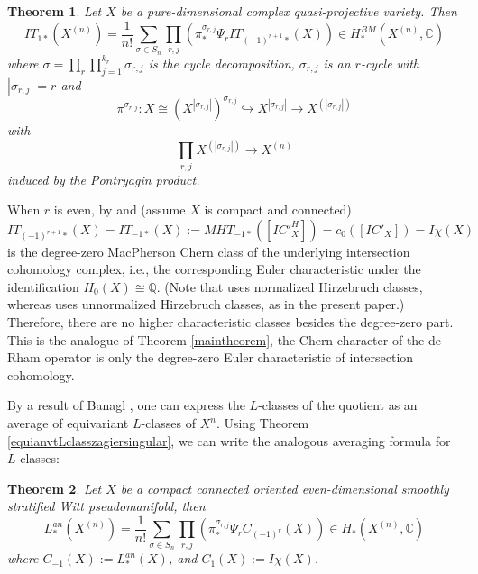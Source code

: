 \documentclass[11pt,leqno,twoside]{amsart}
\theoremstyle{plainsl}
\newtheorem{theorem}{Theorem}[section]
\theoremstyle{definition}
\newcommand{\Q}{\mathbb{Q}}
\begin{document}
 
 \begin{theorem}\cite[Lemma 3.1, 3.2, 3.3]{CMSSY} \label{it1symmetriccmssythm}
 Let $X$ be a pure-dimensional complex quasi-projective variety. Then
\begin{equation}\label{symfactorIT1class} 
    IT_{1*}(X^{(n)})=\frac{1}{n!}\sum_{\sigma\in S_n}  \prod_{r,j} (\pi^{\sigma_{r,j}}_*\Psi_rIT_{(-1)^{r+1}*}(X)) \in H^{BM}_*(X^{(n)},\mathbb{C})
\end{equation}
    where $\sigma=\prod_r\prod^{k_r}_{j=1}\sigma_{r,j}$ is the cycle decomposition, $\sigma_{r,j}$ is an $r$-cycle with $|\sigma_{r,j}|=r$ and
    \[\pi^{\sigma_{r,j}}:X\cong (X^{|\sigma_{r,j}|})^{\sigma_{r,j}} \hookrightarrow X^{|\sigma_{r,j}|} \rightarrow X^{(|\sigma_{r,j}|)}\]
with \[\prod_{r,j} X^{(|\sigma_{r,j}|)}\rightarrow X^{(n)}\]
induced by the Pontryagin product.
\end{theorem}
When $r$ is even, by \cite[Prop.~5.21]{S} and \cite{CMSSY} (assume $X$ is compact and connected)
\begin{equation}\label{mhc-1trivial}
    IT_{(-1)^{r+1}*}(X)=IT_{-1*}(X):=MHT_{-1*}([IC'^H_X])=c_0([IC'_X])=I\chi(X)
\end{equation}
is the degree-zero MacPherson Chern class of the underlying intersection cohomology complex, i.e., the corresponding Euler characteristic  under the identification
$H_0(X)\cong \Q$.
(Note that \cite{S} uses normalized Hirzebruch classes, whereas \cite{CMSSY} uses unnormalized Hirzebruch classes, as in the present paper.)
 Therefore, there are no higher characteristic classes besides the degree-zero part. This is the analogue of Theorem \ref{maintheorem}, the Chern character of the de Rham operator is only the degree-zero Euler characteristic of intersection cohomology. 

By a result of Banagl \cite[Thm. 10.1]{B}, one can express the $L$-classes of the quotient as an average of equivariant $L$-classes of $X^n$. Using Theorem \ref{equianvtLclasszagiersingular}, we can write the analogous averaging formula for $L$-classes:
\begin{theorem}\label{symLclassthm}
  Let $X$ be a  compact connected oriented even-dimensional smoothly stratified Witt pseudomanifold, then
\begin{equation}\label{symfactorLclass}
    L^{an}_*(X^{(n)})=\frac{1}{n!}\sum_{\sigma\in S_n}  \prod_{r,j} (\pi^{\sigma_{r,j}}_*\Psi_r C_{(-1)^r}(X)) \in H_*(X^{(n)},\mathbb{C})
\end{equation}
where $C_{-1}(X):=L_*^{an}(X)$, and $C_{1}(X):=I\chi(X)$.
\end{theorem}
\end{document}
